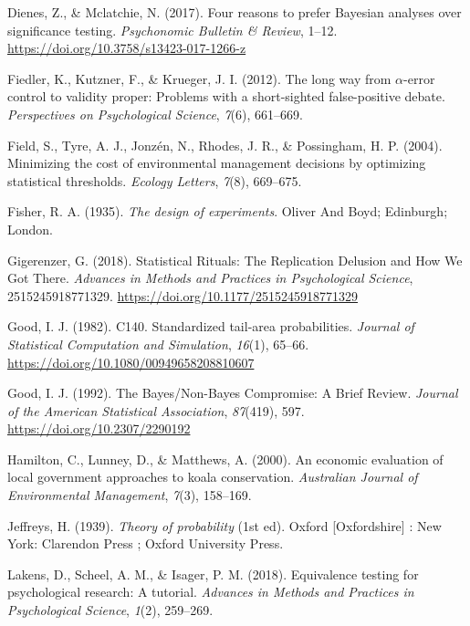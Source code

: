 \documentclass[
  english,
  ,jou,floatsintext]{apa6}
\newlength{\cslhangindent}
\newenvironment{cslreferences}%
  {\setlength{\parindent}{0pt}%
  \everypar{\setlength{\hangindent}{\cslhangindent}}\ignorespaces}%
  {\par}
\begin{document}
\begin{cslreferences}
\leavevmode\hypertarget{ref-dienes_four_2017}{}%
Dienes, Z., \& Mclatchie, N. (2017). Four reasons to prefer Bayesian analyses over significance testing. \emph{Psychonomic Bulletin \& Review}, 1--12. \url{https://doi.org/10.3758/s13423-017-1266-z}

\leavevmode\hypertarget{ref-fiedler2012long}{}%
Fiedler, K., Kutzner, F., \& Krueger, J. I. (2012). The long way from \(\alpha\)-error control to validity proper: Problems with a short-sighted false-positive debate. \emph{Perspectives on Psychological Science}, \emph{7}(6), 661--669.

\leavevmode\hypertarget{ref-field2004minimizing}{}%
Field, S., Tyre, A. J., Jonzén, N., Rhodes, J. R., \& Possingham, H. P. (2004). Minimizing the cost of environmental management decisions by optimizing statistical thresholds. \emph{Ecology Letters}, \emph{7}(8), 669--675.

\leavevmode\hypertarget{ref-fisher_design_1935}{}%
Fisher, R. A. (1935). \emph{The design of experiments}. Oliver And Boyd; Edinburgh; London.

\leavevmode\hypertarget{ref-gigerenzer_statistical_2018}{}%
Gigerenzer, G. (2018). Statistical Rituals: The Replication Delusion and How We Got There. \emph{Advances in Methods and Practices in Psychological Science}, 2515245918771329. \url{https://doi.org/10.1177/2515245918771329}

\leavevmode\hypertarget{ref-good_c140._1982}{}%
Good, I. J. (1982). C140. Standardized tail-area probabilities. \emph{Journal of Statistical Computation and Simulation}, \emph{16}(1), 65--66. \url{https://doi.org/10.1080/00949658208810607}

\leavevmode\hypertarget{ref-good_bayesux2fnon-bayes_1992}{}%
Good, I. J. (1992). The Bayes/Non-Bayes Compromise: A Brief Review. \emph{Journal of the American Statistical Association}, \emph{87}(419), 597. \url{https://doi.org/10.2307/2290192}

\leavevmode\hypertarget{ref-hamilton2000economic}{}%
Hamilton, C., Lunney, D., \& Matthews, A. (2000). An economic evaluation of local government approaches to koala conservation. \emph{Australian Journal of Environmental Management}, \emph{7}(3), 158--169.

\leavevmode\hypertarget{ref-jeffreys_theory_1939}{}%
Jeffreys, H. (1939). \emph{Theory of probability} (1st ed). Oxford {[}Oxfordshire{]} : New York: Clarendon Press ; Oxford University Press.

\leavevmode\hypertarget{ref-lakens2018equivalence}{}%
Lakens, D., Scheel, A. M., \& Isager, P. M. (2018). Equivalence testing for psychological research: A tutorial. \emph{Advances in Methods and Practices in Psychological Science}, \emph{1}(2), 259--269.


\end{cslreferences}
\end{document}

